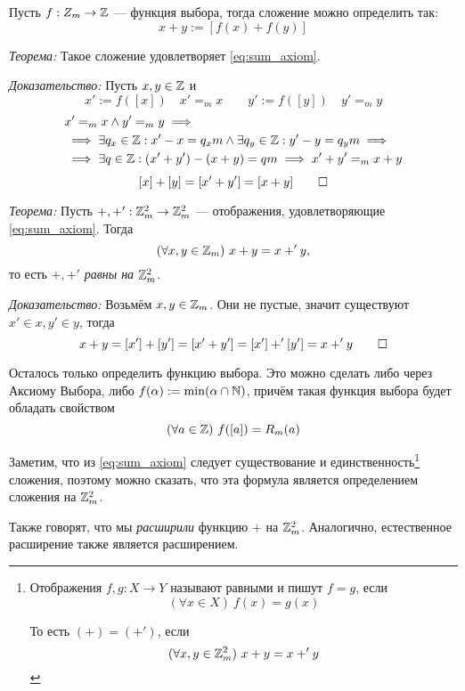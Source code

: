 Пусть $f:Z_{m}\to \mathbb Z$ --- функция выбора, тогда сложение можно
определить так:
\[
  x+y:=[f(x)+f(y)]
\]

\vspace{1em}
{\it Теорема:}
Такое сложение удовлетворяет \eqref{eq:sum_axiom}.

{\it Доказательство:}
Пусть $x,y\in \mathbb Z$ и
\[
  x':=f([x])\quad x'=_{m}x\qquad y':=f([y])\quad y'=_{m}y
\]
\[
  \begin{aligned}
     & x'=_{m}x\land y'=_{m}y\implies                                 \\
     & \implies \exists q_{x}\in\mathbb Z:x'-x=q_{x}m\land
    \exists q_{y}\in\mathbb Z:y'-y=q_{y}m\implies                            \\
     & \implies \exists q\in\mathbb Z:(x'+y')-(x+y)=qm\implies x'+y'=_{m}x+y
  \end{aligned}
\]
\[
  [x]+[y]=[x'+y']=[x+y]\qed
\]

\vspace{1em}
{\it Теорема:} Пусть $+,+':\mathbb Z_{m}^{2}\to\mathbb Z_{m}^{2}$ --- отображения,
удовлетворяющие \eqref{eq:sum_axiom}. Тогда
\[
  (\forall x,y\in\mathbb Z_{m})~x+y=x+'y,
\]
то есть $+,+'$ {\it равны на} $\mathbb Z_{m}^{2}$.

{\it Доказательство:} Возьмём $x,y\in\mathbb Z_{m}$. Они не пустые, значит
существуют $x'\in x,y'\in y$, тогда
\[
  x+y=[x']+[y']=[x'+y']=[x']+'[y']=x+'y\qed
\]

Осталось только определить функцию выбора. Это можно сделать либо через
Аксиому Выбора, либо $f(\alpha):=\min(\alpha\cap\mathbb N)$, причём такая функция
выбора будет обладать свойством
\[
  (\forall a\in\mathbb Z)~f([a])=R_{m}(a)
\]

Заметим, что из \eqref{eq:sum_axiom} следует существование и единственность\footnote{
  Отображения $f,g:X\to Y$ называют равными и пишут $f=g$, если
  \[
    (\forall x\in X)~f(x)=g(x)
  \]

  То есть $(+)=(+')$, если
  \[
    (\forall x,y\in \mathbb Z_{m}^{2})~x+y=x+'y
  \]}
сложения, поэтому можно сказать, что эта формула является определением
сложения на $\mathbb Z_{m}^{2}$.

Также говорят, что мы {\it расширили} функцию $+$
на $\mathbb Z_{m}^{2}$. Аналогично, естественное расширение также является расширением.

